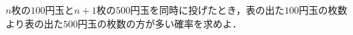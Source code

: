 \documentclass[../../main.tex]{subfiles}
\begin{document}
$n$枚の$100$円玉と$n+1$枚の$500$円玉を同時に投げたとき，表の出た$100$円玉の枚数より表の出た$500$円玉の枚数の方が多い確率を求めよ．
\end{document}
